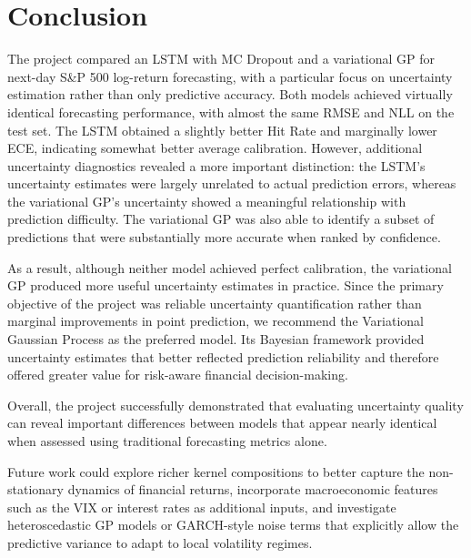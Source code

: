 \section{Conclusion}\label{sec:conclusion}

The project compared an LSTM with MC Dropout and a variational GP for next-day S\&P 500 log-return forecasting, with a particular focus on uncertainty estimation rather than only predictive accuracy. Both models achieved virtually identical forecasting performance, with almost the same RMSE and NLL on the test set. The LSTM obtained a slightly better Hit Rate and marginally lower ECE, indicating somewhat better average calibration. However, additional uncertainty diagnostics revealed a more important distinction: the LSTM's uncertainty estimates were largely unrelated to actual prediction errors, whereas the variational GP's uncertainty showed a meaningful relationship with prediction difficulty. The variational GP was also able to identify a subset of predictions that were substantially more accurate when ranked by confidence.

As a result, although neither model achieved perfect calibration, the variational GP produced more useful uncertainty estimates in practice. Since the primary objective of the project was reliable uncertainty quantification rather than marginal improvements in point prediction, we recommend the Variational Gaussian Process as the preferred model. Its Bayesian framework provided uncertainty estimates that better reflected prediction reliability and therefore offered greater value for risk-aware financial decision-making.

Overall, the project successfully demonstrated that evaluating uncertainty quality can reveal important differences between models that appear nearly identical when assessed using traditional forecasting metrics alone.

Future work could explore richer kernel compositions to better capture the non-stationary dynamics of financial returns, incorporate macroeconomic features such as the VIX or interest rates as additional inputs, and investigate heteroscedastic GP models or GARCH-style noise terms that explicitly allow the predictive variance to adapt to local volatility regimes.
